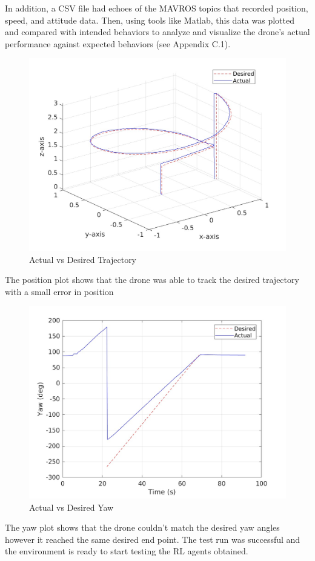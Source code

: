 In addition, a CSV file had echoes of the MAVROS topics that recorded position, speed, and attitude data. Then, using tools like Matlab, this data was plotted and compared with intended behaviors to analyze and visualize the drone's actual performance against expected behaviors (see Appendix C.1).
        \begin{figure}[H]
            \centering
            \includegraphics[width=0.6\linewidth]{Images/traj.jpg}
            \caption{Actual vs Desired Trajectory}
            \label{trajj}
        \end{figure}
        The position plot shows that the drone was able to track the desired trajectory with a small error in position
        \begin{figure}[H]
            \centering
            \includegraphics[width=0.6\linewidth]{Images/yaw.jpg}
            \caption{Actual vs Desired Yaw}
            \label{yaw}
        \end{figure}
        The yaw plot shows that the drone couldn't match the desired yaw angles however it reached the same desired end point. The test run was successful and the environment is ready to start testing the RL agents obtained.
\clearpage